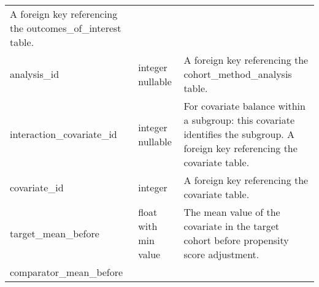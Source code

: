 \documentclass[
]{article}
\begin{document}
\begin{longtable}[]{@{}lll@{}}
\begin{minipage}[t]{0.50\columnwidth}
A foreign key referencing the outcomes\_of\_interest table.\strut
\end{minipage}\tabularnewline
\begin{minipage}[t]{0.23\columnwidth}\raggedright
analysis\_id\strut
\end{minipage} & \begin{minipage}[t]{0.18\columnwidth}\raggedright
integer nullable\strut
\end{minipage} & \begin{minipage}[t]{0.50\columnwidth}\raggedright
A foreign key referencing the cohort\_method\_analysis table.\strut
\end{minipage}\tabularnewline
\begin{minipage}[t]{0.23\columnwidth}\raggedright
interaction\_covariate\_id\strut
\end{minipage} & \begin{minipage}[t]{0.18\columnwidth}\raggedright
integer nullable\strut
\end{minipage} & \begin{minipage}[t]{0.50\columnwidth}\raggedright
For covariate balance within a subgroup: this covariate identifies the
subgroup. A foreign key referencing the covariate table.\strut
\end{minipage}\tabularnewline
\begin{minipage}[t]{0.23\columnwidth}\raggedright
covariate\_id\strut
\end{minipage} & \begin{minipage}[t]{0.18\columnwidth}\raggedright
integer\strut
\end{minipage} & \begin{minipage}[t]{0.50\columnwidth}\raggedright
A foreign key referencing the covariate table.\strut
\end{minipage}\tabularnewline
\begin{minipage}[t]{0.23\columnwidth}\raggedright
target\_mean\_before\strut
\end{minipage} & \begin{minipage}[t]{0.18\columnwidth}\raggedright
float with min value\strut
\end{minipage} & \begin{minipage}[t]{0.50\columnwidth}\raggedright
The mean value of the covariate in the target cohort before propensity
score adjustment.\strut
\end{minipage}\tabularnewline
\begin{minipage}[t]{0.23\columnwidth}\raggedright
comparator\_mean\_before\strut

\end{minipage}
\end{longtable}
\end{document}
